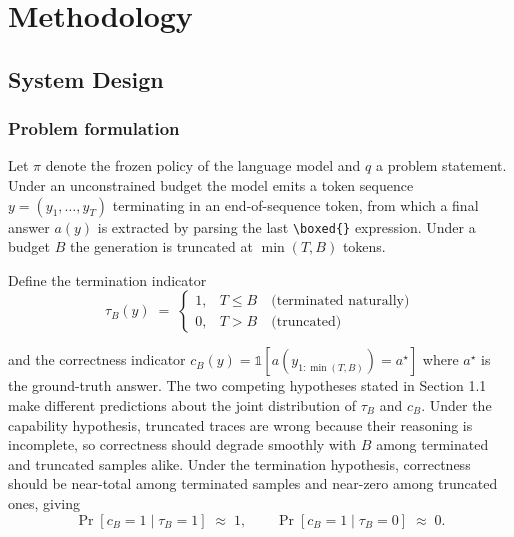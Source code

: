 \documentclass[12pt,a4paper,oneside]{report}
\newcommand{\boxedans}{\texttt{\textbackslash boxed\{\}}}
\begin{document}
\chapter{Methodology}

\section{System Design}

\subsection{Problem formulation}

Let $\pi$ denote the frozen policy of the language model and $q$ a problem
statement. Under an unconstrained budget the model emits a token sequence
$y = (y_1,\dots,y_T)$ terminating in an end-of-sequence token, from which a
final answer $a(y)$ is extracted by parsing the last \boxedans{} expression.
Under a budget $B$ the generation is truncated at $\min(T,B)$ tokens.

Define the termination indicator
\begin{equation}
\tau_B(y) \;=\;
\begin{cases}
1, & T \le B \quad \text{(terminated naturally)}\\[2pt]
0, & T > B \quad \text{(truncated)}
\end{cases}
\label{eq:tau}
\end{equation}

and the correctness indicator $c_B(y) = \mathbb{1}\!\left[a(y_{1:\min(T,B)}) =
a^{\star}\right]$ where $a^{\star}$ is the ground-truth answer. The two
competing hypotheses stated in Section 1.1 make different predictions about the
joint distribution of $\tau_B$ and $c_B$. Under the capability hypothesis,
truncated traces are wrong because their reasoning is incomplete, so correctness
should degrade smoothly with $B$ among terminated and truncated samples alike.
Under the termination hypothesis, correctness should be near-total among
terminated samples and near-zero among truncated ones, giving
\begin{equation}
\Pr\!\left[c_B = 1 \mid \tau_B = 1\right] \;\approx\; 1,
\qquad
\Pr\!\left[c_B = 1 \mid \tau_B = 0\right] \;\approx\; 0 .
\label{eq:hypotheses}
\end{equation}
\end{document}

